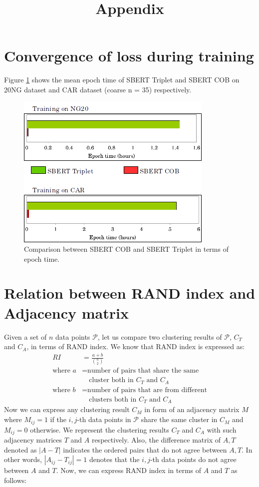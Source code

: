 \documentclass[11pt,a4paper]{article}
\title{Appendix}
\date{}
\begin{document}
\section{Convergence of loss during training} 
Figure \ref{fig:train} shows the mean epoch time of SBERT Triplet and SBERT COB on 20NG dataset and CAR dataset (coarse n = 35) respectively.
\begin{figure}[t]
    \centering
    \includegraphics[scale=0.75]{acl-ijcnlp2021-templates/epoch_time.png}
    \caption{Comparison between SBERT COB and SBERT Triplet in terms of epoch time.}
    \label{fig:train}
\end{figure}

\section{Relation between RAND index and Adjacency matrix} Given a set of $n$ data points $\mathcal{P}$, let us compare two clustering results of $\mathcal{P}$, $C_T$ and $C_A$, in terms of RAND index. We know that RAND index is expressed as:
\begin{align*}
    RI &= \frac{a+b}{\binom{n}{2}} \\
    \textrm{where } a &= \textrm{number of pairs that share the same} \\ 
    & \quad \textrm{cluster both in $C_T$ and $C_A$} \\
    \textrm{where } b &= \textrm{number of pairs that are from different} \\
    & \quad \textrm{clusters both in $C_T$ and $C_A$}
\end{align*}
Now we can express any clustering result $C_M$ in form of an adjacency matrix $M$ where $M_{ij}=1$ if the $i,j$-th data points in $\mathcal{P}$ share the same cluster in $C_M$ and $M_{ij}=0$ otherwise. We represent the clustering results $C_T$ and $C_A$ with such adjacency matrices $T$ and $A$ respectively. Also, the difference matrix of $A,T$ denoted as $|A-T|$ indicates the ordered pairs that do not agree between $A,T$. In other words, $|A_{ij}-T_{ij}|=1$ denotes that the $i,j$-th data points do not agree between $A$ and $T$. Now, we can express RAND index in terms of $A$ and $T$ as follows:
\end{document}
